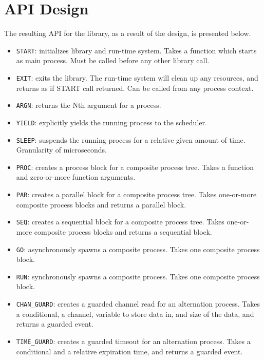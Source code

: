 \section{API Design}
\label{sec:api_design}

The resulting API for the library, as a result of the design, is presented below. 

\begin{itemize}[topsep=0em,itemsep=-1em,partopsep=0.5em,parsep=1em]
    \item \texttt{START}: initializes library and run\hyp{}time system. Takes a function which starts as main process. Must be called before any other library call.
    \item \texttt{EXIT}: exits the library. The run\hyp{}time system will clean up any resources, and returns as if START call returned. Can be called from any process context. 
    \item \texttt{ARGN}: returns the Nth argument for a process. 
    \item \texttt{YIELD}: explicitly yields the running process to the scheduler.
    \item \texttt{SLEEP}: suspends the running process for a relative given amount of time. Granularity of microseconds. 
    \item \texttt{PROC}: creates a process block for a composite process tree. Takes a function and zero\hyp{}or\hyp{}more function arguments. 
    \item \texttt{PAR}: creates a parallel block for a composite process tree. Takes one\hyp{}or\hyp{}more composite process blocks and returns a parallel block.
    \item \texttt{SEQ}: creates a sequential block for a composite process tree. Takes one\hyp{}or\hyp{}more composite process blocks and returns a sequential block.
    \item \texttt{GO}: asynchronously spawns a composite process. Takes one composite process block.
    \item \texttt{RUN}: synchronously spawns a composite process. Takes one composite process block.
    \item \texttt{CHAN\_GUARD}: creates a guarded channel read for an alternation process. Takes a conditional, a channel, variable to store data in, and size of the data, and returns a guarded event.
    \item \texttt{TIME\_GUARD}: creates a guarded timeout for an alternation process. Takes a conditional and a relative expiration time, and returns a guarded event.

\end{itemize}
